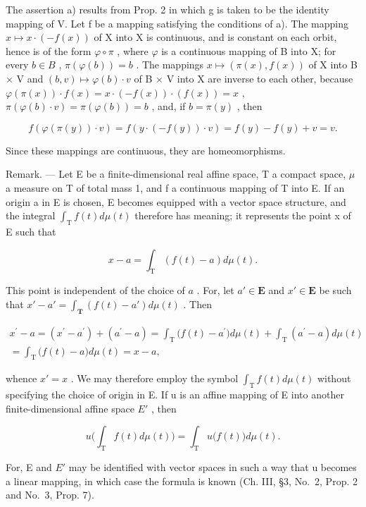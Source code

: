 The assertion a) results from Prop. 2 in which g is taken to be the identity mapping of V. Let f be a mapping satisfying the conditions of a). The mapping \(x \mapsto x \cdot (-f(x))\) of X into X is continuous, and is constant on each orbit, hence is of the form \(\varphi \circ \pi\) , where \(\varphi\) is a continuous mapping of B into X; for every \(b \in B\) , \(\pi(\varphi(b)) = b\) . The mappings \(x \mapsto (\pi(x), f(x))\) of X into B × V and \((b, v) \mapsto \varphi(b) \cdot v\) of B × V into X are inverse to each other, because \(\varphi(\pi(x)) \cdot f(x) = x \cdot (-f(x)) \cdot (f(x)) = x\) , \(\pi(\varphi(b) \cdot v) = \pi(\varphi(b)) = b\) , and, if \(b = \pi(y)\) , then

\[
f (\varphi (\pi (y)) \cdot v) = f (y \cdot (- f (y)) \cdot v) = f (y) - f (y) + v = v.
\]

Since these mappings are continuous, they are homeomorphisms.

Remark. --- Let E be a finite-dimensional real affine space, T a compact space, \(\mu\) a measure on T of total mass 1, and f a continuous mapping of T into E. If an origin a in E is chosen, E becomes equipped with a vector space structure, and the integral \(\int_{\mathrm{T}} f(t) d\mu(t)\) therefore has meaning; it represents the point x of E such that

\[
x - a = \int_ {\mathrm{T}} (f (t) - a) d \mu (t).
\]

This point is independent of the choice of \(a\) . For, let \(a' \in \mathbf{E}\) and \(x' \in \mathbf{E}\) be such that \(x' - a' = \int_{\mathbf{T}} (f(t) - a') d\mu(t)\) . Then

\[
\begin{array}{c} x ^ {\prime} - a = (x ^ {\prime} - a ^ {\prime}) + (a ^ {\prime} - a) = \int_ {\mathrm{T}} \bigl (f (t) - a ^ {\prime} \bigr) d \mu (t) + \int_ {\mathrm{T}} (a ^ {\prime} - a) d \mu (t) \\ = \int_ {\mathrm{T}} \bigl (f (t) - a \bigr) d \mu (t) = x - a, \end{array}
\]

whence \(x' = x\) . We may therefore employ the symbol \(\int_{\mathrm{T}} f(t) d\mu(t)\) without specifying the choice of origin in E. If u is an affine mapping of E into another finite-dimensional affine space \(E'\) , then

\[
u \Big (\int_ {\mathrm{T}} f (t) d \mu (t) \Big) = \int_ {\mathrm{T}} u \big (f (t) \big) d \mu (t).
\]

For, E and \(E'\) may be identified with vector spaces in such a way that u becomes a linear mapping, in which case the formula is known (Ch. III, §3, No.~2, Prop. 2 and No.~3, Prop. 7).

